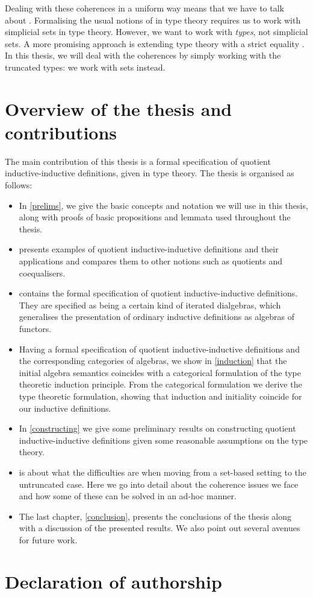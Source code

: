 Dealing with these coherences in a uniform way means that we have to
talk about \inftycats \cite{Camarena2013}. Formalising the usual
notions of \inftycat in type theory requires us to work with
simplicial sets in type theory. However, we want to work with
\emph{types}, not simplicial sets. A more promising approach is
extending type theory with a strict equality
\cite{Altenkirch2016ii,Altenkirch2016iii}. In this thesis, we will
deal with the coherences by simply working with the truncated types:
we work with sets instead.

\section{Overview of the thesis and contributions}

The main contribution of this thesis is a formal specification of
quotient inductive-inductive definitions, given in type theory. The
thesis is organised as follows:

\begin{itemize}
\item In \cref{prelims}, we give the basic concepts and notation we
  will use in this thesis, along with proofs of basic propositions and
  lemmata used throughout the thesis.
\item {} presents examples of quotient inductive-inductive
  definitions and their applications and compares them to other
  notions such as quotients and coequalisers.
\item {} contains the formal specification of quotient
  inductive-inductive definitions. They are specified as being a
  certain kind of iterated dialgebras, which generalises the
  presentation of ordinary inductive definitions as algebras of
  functors.
\item Having a formal specification of quotient inductive-inductive
  definitions and the corresponding categories of algebras, we show in
  \cref{induction} that the initial algebra semantics coincides with a
  categorical formulation of the type theoretic induction
  principle. From the categorical formulation we derive the type
  theoretic formulation, showing that induction and initiality
  coincide for our inductive definitions.
\item In \cref{constructing} we give some preliminary results on
  constructing quotient inductive-inductive definitions given some
  reasonable assumptions on the type theory.
\item {} is about what the difficulties are when
  moving from a set-based setting to the untruncated case. Here we go
  into detail about the coherence issues we face and how some of these
  can be solved in an ad-hoc manner.
\item The last chapter, \cref{conclusion}, presents the conclusions of
  the thesis along with a discussion of the presented results. We also
  point out several avenues for future work.
\end{itemize}

\section{Declaration of authorship}

